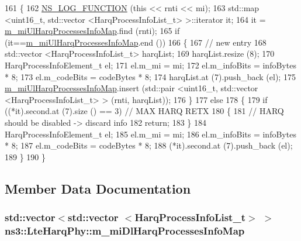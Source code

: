 \begin{DoxyCode}
161 \{
162   \hyperlink{log-macros-disabled_8h_a90b90d5bad1f39cb1b64923ea94c0761}{NS\_LOG\_FUNCTION} (\textcolor{keyword}{this} << rnti << mi);
163   std::map <uint16\_t, std::vector <HarqProcessInfoList\_t> >::iterator it;
164   it = \hyperlink{classns3_1_1LteHarqPhy_a5c2076f55ee78d6e83434e34db799e67}{m\_miUlHarqProcessesInfoMap}.find (rnti);
165   \textcolor{keywordflow}{if} (it==\hyperlink{classns3_1_1LteHarqPhy_a5c2076f55ee78d6e83434e34db799e67}{m\_miUlHarqProcessesInfoMap}.end ())
166     \{
167       \textcolor{comment}{// new entry}
168       std::vector <HarqProcessInfoList\_t> harqList;
169       harqList.resize (8);
170       HarqProcessInfoElement\_t el;
171       el.m\_mi = mi;
172       el.m\_infoBits = infoBytes * 8;
173       el.m\_codeBits = codeBytes * 8;
174       harqList.at (7).push\_back (el);
175       \hyperlink{classns3_1_1LteHarqPhy_a5c2076f55ee78d6e83434e34db799e67}{m\_miUlHarqProcessesInfoMap}.insert (std::pair <uint16\_t, std::vector
       <HarqProcessInfoList\_t> > (rnti, harqList));
176     \}
177   \textcolor{keywordflow}{else}
178     \{
179       \textcolor{keywordflow}{if} ((*it).second.at (7).size () == 3) \textcolor{comment}{// MAX HARQ RETX}
180         \{
181           \textcolor{comment}{// HARQ should be disabled -> discard info}
182           \textcolor{keywordflow}{return};
183         \}
184       HarqProcessInfoElement\_t el;
185       el.m\_mi = mi;
186       el.m\_infoBits = infoBytes * 8;
187       el.m\_codeBits = codeBytes * 8;
188       (*it).second.at (7).push\_back (el);
189     \}
190 \}
\end{DoxyCode}


\subsection{Member Data Documentation}
\subsubsection[{\texorpdfstring{m\+\_\+mi\+Dl\+Harq\+Processes\+Info\+Map}{m_miDlHarqProcessesInfoMap}}]{\setlength{\rightskip}{0pt plus 5cm}std\+::vector$<$std\+::vector $<${\bf Harq\+Process\+Info\+List\+\_\+t}$>$ $>$ ns3\+::\+Lte\+Harq\+Phy\+::m\+\_\+mi\+Dl\+Harq\+Processes\+Info\+Map\hspace{0.3cm}{\ttfamily [private]}}\hypertarget{classns3_1_1LteHarqPhy_a9c05c5106b4d55fbf62a1545ba8f9259}{}\label{classns3_1_1LteHarqPhy_a9c05c5106b4d55fbf62a1545ba8f9259}
